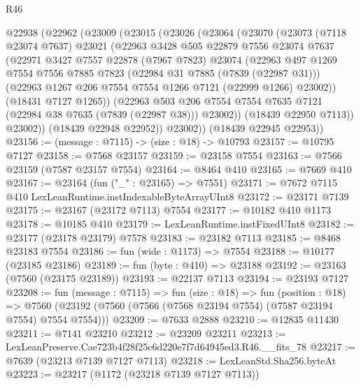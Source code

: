 \begin{lexlean}{R46}
\begin{coremodule}
  @22938
    (@22962
      (@23009
        (@23015
          (@23026
            (@23064
              (@23070
                (@23073
                  (@7118 @23074 @7637)
                  @23021
                  (@22963
                    @3428
                    @505
                    @22879
                    @7556
                    @23074
                    @7637
                    (@22971
                      @3427
                      @7557
                      @22878
                      (@7967 @7823)
                      @23074
                      (@22963
                        @497
                        @1269
                        @7554
                        @7556
                        @7885
                        @7823
                        (@22984 @31 @7885 (@7839 (@22987 @31)))
                        (@22963 @1267 @206 @7554 @7554 @1266 @7121 (@22999 @1266) @23002))
                      (@18431 @7127 @1265))
                    (@22963
                      @503
                      @206
                      @7554
                      @7554
                      @7635
                      @7121
                      (@22984 @38 @7635 (@7839 (@22987 @38)))
                      @23002))
                  (@18439 @22950 @7113))
                @23002))
            (@18439 @22948 @22952))
          @23002))
      (@18439 @22945 @22953))
@23156 := (message : @7115) -> (size : @18) -> @10793
@23157 := @10795 @7127
@23158 := @7568 @23157
@23159 := @23158 @7554
@23163 := @7566 @23159 (@7587 @23157 @7554)
@23164 := @8464 @410
@23165 := @7669 @410
@23167 := @23164 (fun ("_" : @23165) => @7551)
@23171 := @7672 @7115 @410 LexLeanRuntime.instIndexableByteArrayUInt8
@23172 := @23171 @7139
@23175 := @23167 (@23172 @7113) @7554
@23177 := @10182 @410 @1173
@23178 := @10185 @410
@23179 := LexLeanRuntime.instFixedUInt8
@23182 := @23177 (@23178 @23179) @7578
@23183 := @23182 @7113
@23185 := @8468 @23183 @7554
@23186 := fun (wide : @1173) => @7554
@23188 := @10177 (@23185 @23186)
@23189 := fun (byte : @410) => @23188
@23192 := @23163 (@7560 (@23175 @23189))
@23193 := @22137 @7113
@23194 := @23193 @7127
@23208 := fun (message : @7115) =>
  fun (size : @18) =>
  fun (position : @18) =>
  @7560 (@23192 (@7560 (@7566 (@7568 @23194 @7554) (@7587 @23194 @7554) @7554 @7554)))
@23209 := @7633 @2888
@23210 := @12835 @11430
@23211 := @7141 @23210
@23212 := @23209 @23211
@23213 := LexLeanPreserve.Cae723b4f28f25c6d220e7f7d64945ed3.R46.__fits_78
@23217 := @7639 (@23213 @7139 @7127 @7113)
@23218 := LexLeanStd.Sha256.byteAt
@23223 := @23217 (@1172 (@23218 @7139 @7127 @7113))

\end{coremodule}
\end{lexlean}
